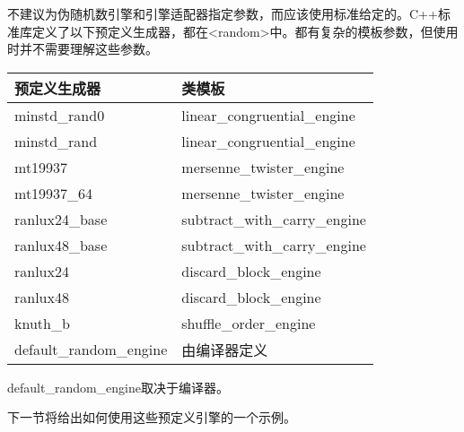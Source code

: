 不建议为伪随机数引擎和引擎适配器指定参数，而应该使用标准给定的。C++标准库定义了以下预定义生成器，都在<random>中。都有复杂的模板参数，但使用时并不需要理解这些参数。

\begin{longtable}{|l|l|}
\hline
\textbf{预定义生成器} & \textbf{类模板}       \\ \hline
\endfirsthead
%
\endhead
%
minstd\_rand0                 & linear\_congruential\_engine  \\ \hline
minstd\_rand                  & linear\_congruential\_engine  \\ \hline
mt19937                       & mersenne\_twister\_engine     \\ \hline
mt19937\_64                   & mersenne\_twister\_engine     \\ \hline
ranlux24\_base                & subtract\_with\_carry\_engine \\ \hline
ranlux48\_base                & subtract\_with\_carry\_engine \\ \hline
ranlux24                      & discard\_block\_engine        \\ \hline
ranlux48                      & discard\_block\_engine        \\ \hline
knuth\_b                      & shuffle\_order\_engine        \\ \hline
default\_random\_engine       & 由编译器定义        \\ \hline
\end{longtable}

default\_random\_engine取决于编译器。

下一节将给出如何使用这些预定义引擎的一个示例。

















